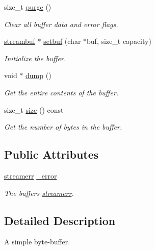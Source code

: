\begin{DoxyCompactItemize}
size\+\_\+t \hyperlink{classuio_1_1streambuf_a8b39ea522254c9f1c9788d2c8f1b1851}{purge} ()
\begin{DoxyCompactList}\small\item\em Clear all buffer data and error flags. \end{DoxyCompactList}\item 
\hyperlink{classuio_1_1streambuf}{streambuf} $\ast$ \hyperlink{classuio_1_1streambuf_a843b3684bd11cd1fae95a9bbc28b9794}{setbuf} (char $\ast$buf, size\+\_\+t capacity)
\begin{DoxyCompactList}\small\item\em Initialize the buffer. \end{DoxyCompactList}\item 
void $\ast$ \hyperlink{classuio_1_1streambuf_aae4696bb257ac7a41de409a01c454534}{dump} ()
\begin{DoxyCompactList}\small\item\em Get the entire contents of the buffer. \end{DoxyCompactList}\item 
size\+\_\+t \hyperlink{classuio_1_1streambuf_a5db2da142ca9bae814a73df3f794350f}{size} () const 
\begin{DoxyCompactList}\small\item\em Get the number of bytes in the buffer. \end{DoxyCompactList}\end{DoxyCompactItemize}
\subsection*{Public Attributes}
\begin{DoxyCompactItemize}
\item 
\hyperlink{classuio_1_1streamerr}{streamerr} \hyperlink{classuio_1_1streambuf_a93e2fac86ea892c0b8b33c0bc83dfd67}{\+\_\+error}\hypertarget{classuio_1_1streambuf_a93e2fac86ea892c0b8b33c0bc83dfd67}{}\label{classuio_1_1streambuf_a93e2fac86ea892c0b8b33c0bc83dfd67}

\begin{DoxyCompactList}\small\item\em The buffer\textquotesingle{}s \hyperlink{classuio_1_1streamerr}{streamerr}. \end{DoxyCompactList}\end{DoxyCompactItemize}


\subsection{Detailed Description}
A simple byte-\/buffer. 

